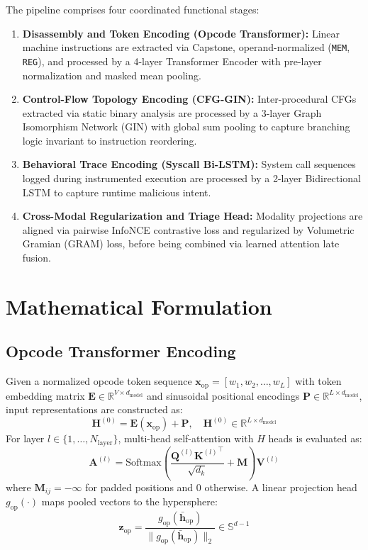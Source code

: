 \documentclass[pdflatex,sn-mathphys-num]{sn-jnl}
\begin{document}
The pipeline comprises four coordinated functional stages:
\begin{enumerate}
    \item \textbf{Disassembly and Token Encoding (Opcode Transformer):} Linear machine instructions are extracted via Capstone, operand-normalized (\texttt{MEM}, \texttt{REG}), and processed by a 4-layer Transformer Encoder with pre-layer normalization and masked mean pooling.
    \item \textbf{Control-Flow Topology Encoding (CFG-GIN):} Inter-procedural CFGs extracted via static binary analysis are processed by a 3-layer Graph Isomorphism Network (GIN) with global sum pooling to capture branching logic invariant to instruction reordering.
    \item \textbf{Behavioral Trace Encoding (Syscall Bi-LSTM):} System call sequences logged during instrumented execution are processed by a 2-layer Bidirectional LSTM to capture runtime malicious intent.
    \item \textbf{Cross-Modal Regularization and Triage Head:} Modality projections are aligned via pairwise InfoNCE contrastive loss and regularized by Volumetric Gramian (GRAM) loss, before being combined via learned attention late fusion.
\end{enumerate}

\section{Mathematical Formulation}\label{sec:math}

\subsection{Opcode Transformer Encoding}\label{sec:math_opcode}
Given a normalized opcode token sequence $\mathbf{x}_{\text{op}} = [w_1, w_2, \dots, w_L]$ with token embedding matrix $\mathbf{E} \in \mathbb{R}^{V \times d_{\text{model}}}$ and sinusoidal positional encodings $\mathbf{P} \in \mathbb{R}^{L \times d_{\text{model}}}$, input representations are constructed as:
\begin{equation}
\mathbf{H}^{(0)} = \mathbf{E}(\mathbf{x}_{\text{op}}) + \mathbf{P}, \quad \mathbf{H}^{(0)} \in \mathbb{R}^{L \times d_{\text{model}}}
\end{equation}
For layer $l \in \{1, \dots, N_{\text{layer}}\}$, multi-head self-attention with $H$ heads is evaluated as:
\begin{equation}
\mathbf{A}^{(l)} = \text{Softmax}\left(\frac{\mathbf{Q}^{(l)} {\mathbf{K}^{(l)}}^\top}{\sqrt{d_k}} + \mathbf{M}\right)\mathbf{V}^{(l)}
\end{equation}
where $\mathbf{M}_{ij} = -\infty$ for padded positions and 0 otherwise. A linear projection head $g_{\text{op}}(\cdot)$ maps pooled vectors to the hypersphere:
\begin{equation}
\mathbf{z}_{\text{op}} = \frac{g_{\text{op}}(\bar{\mathbf{h}}_{\text{op}})}{\|g_{\text{op}}(\bar{\mathbf{h}}_{\text{op}})\|_2} \in \mathbb{S}^{d-1}
\end{equation}
\end{document}
